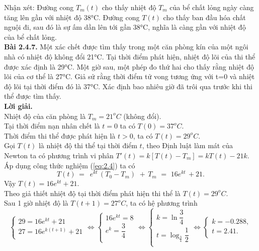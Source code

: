 \noindent Nhận xét: Đường cong ${{T}_{m}}(t)$ cho thấy nhiệt độ ${{T}_{m}}$ của bể chất lỏng ngày càng tăng lên gần với nhiệt độ 38°C. Đường cong $T(t)$ cho thấy ban đầu hóa chất nguội đi, sau đó là sự ấm dần lên  tới gần 38°C, nghĩa là càng gần với nhiệt độ của bể chất lỏng.\\
\textbf{Bài 2.4.7. }Một xác chết được tìm thấy trong một căn phòng kín của một ngôi nhà có nhiệt độ không đổi 21°C. Tại thời điểm phát hiện, nhiệt độ lõi của thi thể được xác định là 29°C. Một giờ sau, một phép đo thứ hai cho thấy rằng nhiệt độ lõi của cơ thể là 27°C. Giả sử rằng thời điểm tử vong tương ứng với t=0 và nhiệt độ lõi tại thời điểm đó là 37°C. Xác định bao nhiêu giờ đã trôi qua trước khi thi thể được tìm thấy.\\
\textbf{Lời giải.}\\
Nhiệt độ của căn phòng là  ${{T}_{m}}={{21}^{o}}C$ (không đổi).\\
Tại thời điểm nạn nhân chết là $t=0$ ta có $T(0)={{37}^{o}}C$. \\
Thời điểm thi thể được phát hiện là $t>0$, ta có $T(t)={{29}^{o}}C$. \\
Gọi $T(t)$ là nhiệt độ thi thể tại thời điểm $t$, theo Định luật làm mát của Newton ta có phương trình vi phân  ${T}'(t)=k\left[ T(t)-{{T}_{m}} \right]=kT(t)-21k$. \\
Áp dụng công thức nghiệm (\ref{eq:2.4}) ta có \[T(t)\,=\,\,\,{{e}^{kt}}\,({{T}_{0}}-{{T}_{m}})\,\,+\,{{T}_{m}}\,\,=\,\,16{{e}^{kt}}\,+21.\]
Vậy $T(t)=16{{e}^{kt}}+21$.\\
Theo giả thiết nhiệt độ tại thời điểm phát hiện thi thể là $T(t)={{29}^{o}}C$. \\
Sau 1 giờ nhiệt độ là $T(t+1)={{27}^{o}}C$, ta có hệ phương trình
$$\left\{ \begin{array}{l}
	 29=16{{e}^{kt}}+21 \\ 
	 27=16{{e}^{k(t+1)}}+21 \\ 
\end{array} \right.\Leftrightarrow \left\{ \begin{array}{l}
	 16{{e}^{kt}}=8 \\ 
	 {{e}^{k}}=\dfrac{3}{4} \\  
\end{array} \right.\Leftrightarrow \left\{ \begin{array}{l}
	 k=\ln \dfrac{3}{4} \\ 
	 t={{\log }_{\frac{3}{4}}}\dfrac{1}{2} \\ 
\end{array} \right.\Leftrightarrow \left\{ \begin{array}{l}
	 k=-0.288, \\ 
	 t=2.41. \\ 
\end{array} \right.$$
